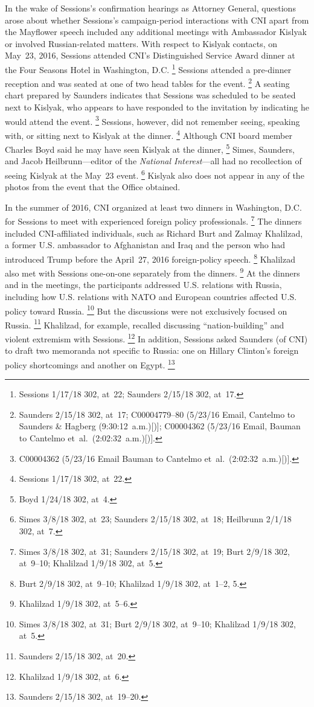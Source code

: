 In the wake of Sessions's confirmation hearings as Attorney General, questions arose about whether Sessions's campaign-period interactions with CNI apart from the Mayflower speech included any additional meetings with Ambassador Kislyak or involved Russian-related matters.
With respect to Kislyak contacts, on May~23, 2016, Sessions attended CNI's Distinguished Service Award dinner at the Four Seasons Hotel in Washington, D.C.%
\footnote{Sessions 1/17/18 302, at~22;
Saunders 2/15/18 302, at~17.}
Sessions attended a pre-dinner reception and was seated at one of two head tables for the event.%
\footnote{Saunders 2/15/18 302, at~17;
C00004779--80 (5/23/16 Email, Cantelmo to Saunders \& Hagberg (9:30:12~a.m.)[)];
C00004362 (5/23/16 Email, Bauman to Cantelmo et~al.\ (2:02:32~a.m.)[)].}
A seating chart prepared by Saunders indicates that Sessions was scheduled to be seated next to Kislyak, who appears to have responded to the invitation by indicating he would attend the event.%
\footnote{C00004362 (5/23/16 Email Bauman to Cantelmo et~al.\ (2:02:32~a.m.)[)].}
Sessions, however, did not remember seeing, speaking with, or sitting next to Kislyak at the dinner.%
\footnote{Sessions 1/17/18 302, at~22.}
Although CNI board member Charles Boyd said he may have seen Kislyak at the dinner,%
\footnote{Boyd 1/24/18 302, at~4.}
Simes, Saunders, and Jacob Heilbrunn---editor of the \textit{National Interest}---all had no recollection of seeing Kislyak at the May~23 event.%
\footnote{Simes 3/8/18 302, at~23;
Saunders 2/15/18 302, at~18;
Heilbrunn 2/1/18 302, at~7.}
Kislyak also does not appear in any of the photos from the event that the Office obtained.

In the summer of 2016, CNI organized at least two dinners in Washington, D.C. for Sessions to meet with experienced foreign policy professionals.%
\footnote{Simes 3/8/18 302, at~31;
Saunders 2/15/18 302, at~19;
Burt 2/9/18 302, at~9--10;
Khalilzad 1/9/18 302, at~5.}
The dinners included CNI-affiliated individuals, such as Richard Burt and Zalmay Khalilzad, a former U.S. ambassador to Afghanistan and Iraq and the person who had introduced Trump before the April~27, 2016 foreign-policy speech.%
\footnote{Burt 2/9/18 302, at~9--10;
Khalilzad 1/9/18 302, at~1--2, 5.}
Khalilzad also met with Sessions one-on-one separately from the dinners.%
\footnote{Khalilzad 1/9/18 302, at~5--6.}
At the dinners and in the meetings, the participants addressed U.S. relations with Russia, including how U.S. relations with NATO and European countries affected U.S. policy toward Russia.%
\footnote{Simes 3/8/18 302, at~31;
Burt 2/9/18 302, at~9--10;
Khalilzad 1/9/18 302, at~5.}
But the discussions were not exclusively focused on Russia.%
\footnote{Saunders 2/15/18 302, at~20.}
Khalilzad, for example, recalled discussing ``nation-building'' and violent extremism with Sessions.%
\footnote{Khalilzad 1/9/18 302, at~6.}
In addition, Sessions asked Saunders (of CNI) to draft two memoranda not specific to Russia: one on Hillary Clinton's foreign policy shortcomings and another on Egypt.%
\footnote{Saunders 2/15/18 302, at~19--20.}

